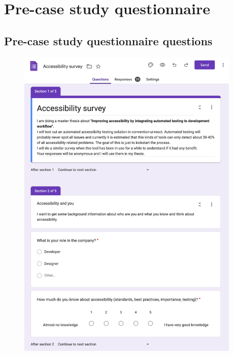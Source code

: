\documentclass{master_thesis}
\begin{document}
\appendix

\renewcommand{\thesection}{\arabic{section}}

\section{Pre-case study questionnaire }\label{appendix:pre-survey}
\subsection{Pre-case study questionnaire questions}\label{appendix:pre-survey-questions}
\begin{figure}[H]
	\centering
	\includegraphics[width=0.95\textwidth]{img/surveys/pre-survey-1.png}
\end{figure}
\end{document}
